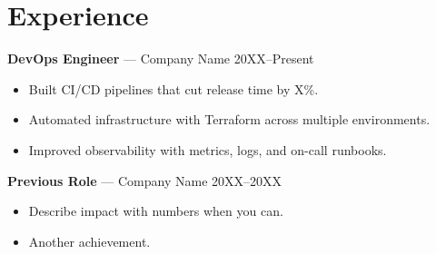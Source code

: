 \section{Experience}
\textbf{DevOps Engineer} — Company Name \hfill 20XX--Present\\
\begin{itemize}
  \item Built CI/CD pipelines that cut release time by X\%.
  \item Automated infrastructure with Terraform across multiple environments.
  \item Improved observability with metrics, logs, and on-call runbooks.
\end{itemize}

\textbf{Previous Role} — Company Name \hfill 20XX--20XX\\
\begin{itemize}
  \item Describe impact with numbers when you can.
  \item Another achievement.
\end{itemize}
